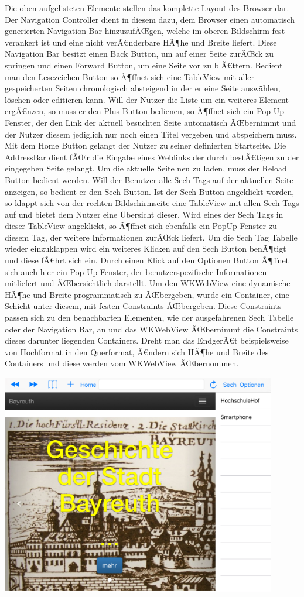 Die oben aufgelisteten Elemente stellen das komplette Layout des Browser dar. Der Navigation Controller dient in diesem dazu, dem Browser einen automatisch generierten Navigation Bar hinzuzufÃŒgen, welche im oberen Bildschirm fest verankert ist und eine nicht verÃ€nderbare HÃ¶he und Breite liefert. Diese Navigation Bar besitzt einen Back Button, um auf einer Seite zurÃŒck zu springen und einen Forward Button, um eine Seite vor zu blÃ€ttern. Bedient man den Lesezeichen Button so Ã¶ffnet sich eine TableView mit aller gespeicherten Seiten chronologisch absteigend in der er eine Seite auswählen, löschen oder editieren kann. Will der Nutzer die Liste um ein weiteres Element ergÃ€nzen, so muss er den Plus Button bedienen, so Ã¶ffnet sich ein Pop Up Fenster, der den Link der aktuell besuchten Seite automatisch ÃŒbernimmt und der Nutzer diesem jediglich nur noch einen Titel vergeben und abspeichern muss. Mit dem Home Button gelangt der Nutzer zu seiner definierten Startseite. Die AddressBar dient fÃŒr die Eingabe eines Weblinks der durch bestÃ€tigen zu der eingegeben Seite gelangt. Um die aktuelle Seite neu zu laden, muss der Reload Button bedient werden. Will der Benutzer alle Sech Tags auf der aktuellen Seite anzeigen, so bedient er den Sech Button. Ist der Sech Button angeklickt worden, so klappt sich von der rechten Bildschirmseite eine TableView mit allen Sech Tags auf und bietet dem Nutzer eine Übersicht dieser. Wird eines der Sech Tags in dieser TableView angeklickt, so Ã¶ffnet sich ebenfalls ein PopUp Fenster zu diesem Tag, der weitere Informationen zurÃŒck liefert. Um die Sech Tag Tabelle wieder einzuklappen wird ein weiteres Klicken auf den Sech Button benÃ¶tigt und diese fÃ€hrt sich ein. Durch einen Klick auf den Optionen Button Ã¶ffnet sich auch hier ein Pop Up Fenster, der benutzerspezifische Informationen mitliefert und ÃŒbersichtlich darstellt. Um den WKWebView eine dynamische HÃ¶he und Breite programmatisch zu ÃŒbergeben, wurde ein Container, eine Schicht unter diesem, mit festen Constraints ÃŒbergeben. Diese Constraints passen sich zu den benachbarten Elementen, wie der ausgefahrenen Sech Tabelle oder der Navigation Bar, an und das WKWebView ÃŒbernimmt die Constraints dieses darunter liegenden Containers. Dreht man das EndgerÃ€t beispielsweise von Hochformat in den Querformat, Ã€ndern sich HÃ¶he und Breite des Containers und diese werden vom WKWebView ÃŒbernommen.

\includegraphics[width=12cm]{Pics/Browser_Hochformat}


